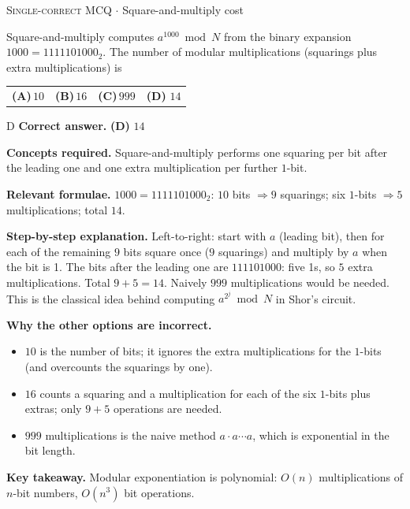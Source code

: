 \documentclass[11pt,a4paper]{article}
\newcommand{\optlabel}[1]{\textbf{(#1)}}
\newcommand{\correctlabel}[1]{\textcolor{okgreen}{\textbf{(#1)}\,\ding{51}}}
\newenvironment{qitem}[1]{\begin{list}{}{\setlength{\leftmargin}{3.3em}\setlength{\labelwidth}{3.1em}%
  \setlength{\labelsep}{0.2em}\setlength{\topsep}{3pt}\setlength{\parsep}{3pt}}\item[\textbf{Q.#1}\hfill]}{\end{list}}
\newcommand{\qsep}{\par\vspace{2pt}{\color{black!15}\hrule}\vspace{4pt}}
\newcommand{\qmeta}[2]{{\footnotesize\color{black!60}\textsc{#1} \;$\cdot$\; #2}\par}
\begin{document}
\begin{qitem}{6}
\qmeta{Single-correct MCQ}{Square-and-multiply cost}
Square-and-multiply computes $a^{1000} \bmod N$ from the binary expansion $1000 = 1111101000_2$. The number of modular multiplications
(squarings plus extra multiplications) is
\par\smallskip\noindent\begin{tabularx}{\linewidth}{@{}*{4}{L}@{}}
\optlabel{A}\,$10$ & \optlabel{B}\,$16$ & \optlabel{C}\,$999$ & \correctlabel{D}\,$14$
\end{tabularx}
\end{qitem}
\begin{solbox}{D}
\textbf{\color{brand}Correct answer.} \textcolor{okgreen}{\textbf{(D)}} $14$

\textbf{\color{brand}Concepts required.} Square-and-multiply performs one squaring per bit after the leading one and one extra multiplication per further $1$-bit.

\textbf{\color{brand}Relevant formulae.} $1000 = 1111101000_2$: $10$ bits $\Rightarrow 9$ squarings; six $1$-bits $\Rightarrow 5$ multiplications; total $14$.

\textbf{\color{brand}Step-by-step explanation.} Left-to-right: start with $a$ (leading bit), then for each of the remaining $9$ bits square once ($9$ squarings) and multiply by $a$ when the bit is
1. The bits after the leading one are $111101000$: five 1s, so $5$ extra multiplications. Total $9 + 5 = 14$. Naively $999$ multiplications would be needed.
This is the classical idea behind computing $a^{2^j} \bmod N$ in Shor's circuit.

\textbf{\color{brand}Why the other options are incorrect.}
\begin{itemize}[leftmargin=2.4em, itemsep=1pt, topsep=2pt]
\item[\textbf{(A)}] $10$ is the number of bits; it ignores the extra multiplications for the $1$-bits (and overcounts the squarings by one).
\item[\textbf{(B)}] $16$ counts a squaring and a multiplication for each of the six $1$-bits plus extras; only $9 + 5$ operations are needed.
\item[\textbf{(C)}] $999$ multiplications is the naive method $a\cdot a\cdots a$, which is exponential in the bit length.
\end{itemize}
\textbf{\color{brand}Key takeaway.} Modular exponentiation is polynomial: $O(n)$ multiplications of $n$-bit numbers, $O(n^3)$ bit operations.
\end{solbox}
\qsep
\end{document}
